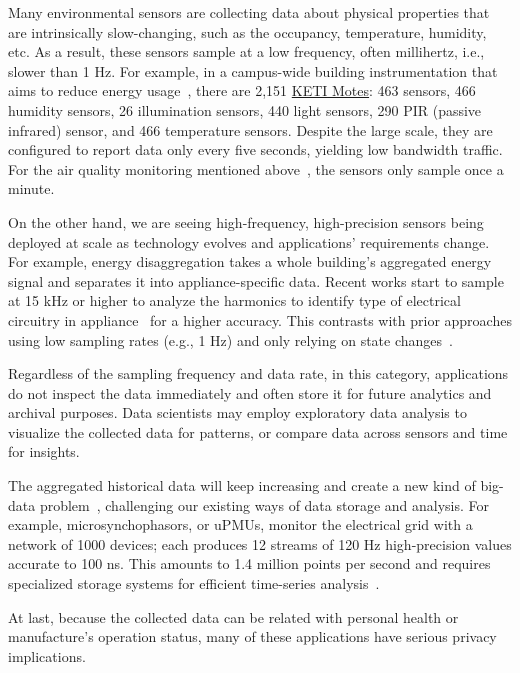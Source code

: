 Many environmental sensors are collecting data about physical properties that
are intrinsically slow-changing, such as the occupancy, temperature, humidity,
etc. As a result, these sensors sample at a low frequency, often millihertz,
i.e., slower than 1 Hz. For example, in a campus-wide building instrumentation
that aims to reduce energy usage~\cite{krioukov2012building}, there are 2,151
\href{http://www.keti.re.kr/}{KETI Motes}: 463  sensors, 466 humidity
sensors, 26 illumination sensors, 440 light sensors, 290 PIR (passive infrared)
sensor, and 466 temperature sensors. Despite the large scale, they are
configured to report data only every five seconds, yielding low bandwidth
traffic. For the air quality monitoring mentioned
above~\cite{cheng2014aircloud}, the sensors only sample once a minute.

On the other hand, we are seeing high-frequency, high-precision sensors being
deployed at scale as technology evolves and applications' requirements
change. For example, energy disaggregation takes a whole building's aggregated
energy signal and separates it into appliance-specific data. Recent works start
to sample at 15 kHz or higher to analyze the harmonics to identify type of
electrical circuitry in appliance~\cite{kolter2011redd} for a higher
accuracy. This contrasts with prior approaches using low sampling rates (e.g., 1
Hz) and only relying on state changes~\cite{hart1992nonintrusive}.

Regardless of the sampling frequency and data rate, in this category,
applications do not inspect the data immediately and often store it for future
analytics and archival purposes. Data scientists may employ exploratory data
analysis to visualize the collected data for patterns, or compare data across
sensors and time for insights.

The aggregated historical data will keep increasing and create a new kind of
big-data problem~\cite{diaz2012big, zaslavsky2013sensing}, challenging our
existing ways of data storage and analysis. For example, microsynchophasors, or
uPMUs, monitor the electrical grid with a network of 1000 devices; each produces
12 streams of 120 Hz high-precision values accurate to 100 ns. This amounts to
1.4 million points per second and requires specialized storage systems for
efficient time-series analysis~\cite{andersen2016btrdb}.

At last, because the collected data can be related with personal health or
manufacture's operation status, many of these applications have serious privacy
implications.

